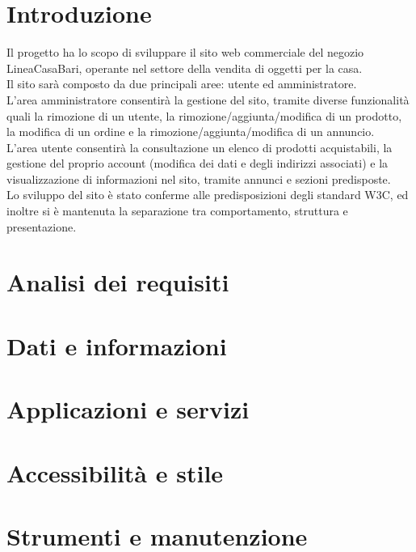 




\makeFrontPage
\clearpage
\tableofcontents
\listoffigures
\clearpage

\section{Introduzione}
Il progetto ha lo scopo di sviluppare il sito web commerciale del negozio LineaCasaBari, operante nel settore della vendita di oggetti per la casa. \\
Il sito sarà composto da due principali aree: utente ed amministratore. \\
L'area amministratore consentirà la gestione del sito, tramite diverse funzionalità quali la rimozione di un utente, la rimozione/aggiunta/modifica di un prodotto, la modifica di un ordine e la rimozione/aggiunta/modifica di un annuncio. \\
L'area utente consentirà la consultazione un elenco di prodotti acquistabili, la gestione del proprio account (modifica dei dati e degli indirizzi associati) e la visualizzazione di informazioni nel sito, tramite annunci e sezioni predisposte. \\
Lo sviluppo del sito è stato conferme alle predisposizioni degli standard W3C, ed inoltre si è mantenuta la separazione tra comportamento, struttura e presentazione.

\section{Analisi dei requisiti} %

\section{Dati e informazioni} %

\section{Applicazioni e servizi} %

\section{Accessibilità e stile} %

\section{Strumenti e manutenzione} %

